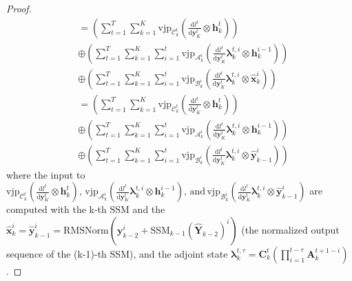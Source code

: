 \documentclass{article}
\newtheorem{proof}{Proof}
\newcommand{\A}{\mathcal{A}}
\newcommand{\B}{\mathcal{B}}
\newcommand{\C}{\mathcal{C}}
\newcommand{\ssm}{\mathrm{SSM}}
\newcommand{\vjp}{\mathrm{vjp}}
\newcommand{\diff}{\mathrm{d}}
\newcommand{\blambda}{\boldsymbol{\lambda}}
\begin{document}
\begin{proof}
\begin{equation}
\begin{split}
    &= \left(\sum_{t=1}^T\sum_{k=1}^K \vjp_{\boldsymbol{\C}^t_k}(\frac{\diff l^t}{\diff \mathbf{y}_K^t}\otimes \mathbf{h}^t_k)\right)\\
    &\oplus \left(\sum_{t=1}^T\sum_{k=1}^K \sum_{i=1}^{t}\vjp_{\boldsymbol{\A}^i_k}(\frac{\diff l^t}{\diff \mathbf{y}_K^t}\blambda^{t,i}_k\otimes \mathbf{h}^{i-1}_k)\right)\\
    &\oplus \left(\sum_{t=1}^T\sum_{k=1}^K \sum_{i=1}^{t}\vjp_{\boldsymbol{\B}^i_k}(\frac{\diff l^t}{\diff \mathbf{y}_K^t}\blambda^{t,i}_k\otimes \hat{\mathbf{x}}^i_k)\right)\\
    &= \left(\sum_{t=1}^T\sum_{k=1}^K \vjp_{\boldsymbol{\C}^t_k}(\frac{\diff l^t}{\diff \mathbf{y}_K^t}\otimes \mathbf{h}^t_k)\right)\\ 
    &\oplus \left(\sum_{t=1}^T\sum_{k=1}^K \sum_{i=1}^{t}\vjp_{\boldsymbol{\A}^i_k}(\frac{\diff l^t}{\diff \mathbf{y}_K^t}\blambda^{t,i}_k\otimes \mathbf{h}^{i-1}_k)\right)\\
    &\oplus \left(\sum_{t=1}^T\sum_{k=1}^K \sum_{i=1}^{t}\vjp_{\boldsymbol{\B}^i_k}(\frac{\diff l^t}{\diff \mathbf{y}_K^t}\blambda^{t,i}_k\otimes \hat{\mathbf{y}}^i_{k-1})\right)
\end{split}
\end{equation}
where the input to $\vjp_{\boldsymbol{\C}^t_k}(\frac{\diff l^t}{\diff \mathbf{y}_K^t}\otimes \mathbf{h}^t_k),\, \vjp_{\boldsymbol{\A}^i_k}(\frac{\diff l^t}{\diff \mathbf{y}_K^t}\blambda^{t,i}_k\otimes \mathbf{h}^{i-1}_k), \,\mathrm{and}\,\vjp_{\boldsymbol{\B}^i_k}(\frac{\diff l^t}{\diff \mathbf{y}_K^t}\blambda^{t,i}_k\otimes \hat{\mathbf{y}}^i_{k-1})$ are computed with the k-th $\ssm$ and the $\hat{\mathbf{x}}_k^i=\hat{\mathbf{y}}_{k-1}^i=\mathrm{RMSNorm}(\mathbf{y}_{k-2}^i+\ssm_{k-1}(\hat{\mathbf{Y}}_{k-2})^i)$ (the normalized output sequence of the (k-1)-th $\ssm$), and the adjoint state $\blambda^{t,\tau}_k=\mathbf{C}^t_k(\prod_{i=1}^{t-\tau}\mathbf{A}_k^{t+1-i})$.
    
\end{proof}
\end{document}
